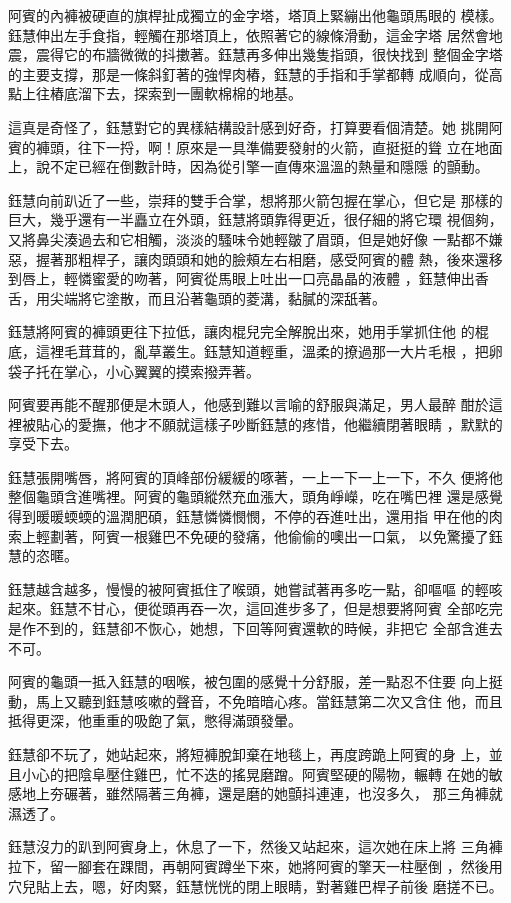 阿賓的內褲被硬直的旗桿扯成獨立的金字塔，塔頂上緊繃出他龜頭馬眼的
模樣。鈺慧伸出左手食指，輕觸在那塔頂上，依照著它的線條滑動，這金字塔
居然會地震，震得它的布牆微微的抖擻著。鈺慧再多伸出幾隻指頭，很快找到
整個金字塔的主要支撐，那是一條斜釘著的強悍肉樁，鈺慧的手指和手掌都轉
成順向，從高點上往樁底溜下去，探索到一團軟棉棉的地基。

這真是奇怪了，鈺慧對它的異樣結構設計感到好奇，打算要看個清楚。她
挑開阿賓的褲頭，往下一捋，啊！原來是一具準備要發射的火箭，直挺挺的聳
立在地面上，說不定已經在倒數計時，因為從引擎一直傳來溫溫的熱量和隱隱
的顫動。

鈺慧向前趴近了一些，崇拜的雙手合掌，想將那火箭包握在掌心，但它是
那樣的巨大，幾乎還有一半矗立在外頭，鈺慧將頭靠得更近，很仔細的將它環
視個夠，又將鼻尖湊過去和它相觸，淡淡的騷味令她輕皺了眉頭，但是她好像
一點都不嫌惡，握著那粗桿子，讓肉頭頭和她的臉頰左右相磨，感受阿賓的體
熱，後來還移到唇上，輕憐蜜愛的吻著，阿賓從馬眼上吐出一口亮晶晶的液體
，鈺慧伸出香舌，用尖端將它塗散，而且沿著龜頭的菱溝，黏膩的深舐著。

鈺慧將阿賓的褲頭更往下拉低，讓肉棍兒完全解脫出來，她用手掌抓住他
的棍底，這裡毛茸茸的，亂草叢生。鈺慧知道輕重，溫柔的撩過那一大片毛根
，把卵袋子托在掌心，小心翼翼的摸索撥弄著。

阿賓要再能不醒那便是木頭人，他感到難以言喻的舒服與滿足，男人最醉
酣於這裡被貼心的愛撫，他才不願就這樣子吵斷鈺慧的疼惜，他繼續閉著眼睛
，默默的享受下去。

鈺慧張開嘴唇，將阿賓的頂峰部份緩緩的啄著，一上一下一上一下，不久
便將他整個龜頭含進嘴裡。阿賓的龜頭縱然充血漲大，頭角崢嶸，吃在嘴巴裡
還是感覺得到暖暖蝡蝡的溫潤肥碩，鈺慧憐憐憫憫，不停的吞進吐出，還用指
甲在他的肉索上輕劃著，阿賓一根雞巴不免硬的發痛，他偷偷的噢出一口氣，
以免驚擾了鈺慧的恣暱。

鈺慧越含越多，慢慢的被阿賓抵住了喉頭，她嘗試著再多吃一點，卻嘔嘔
的輕咳起來。鈺慧不甘心，便從頭再吞一次，這回進步多了，但是想要將阿賓
全部吃完是作不到的，鈺慧卻不恢心，她想，下回等阿賓還軟的時候，非把它
全部含進去不可。

阿賓的龜頭一抵入鈺慧的咽喉，被包圍的感覺十分舒服，差一點忍不住要
向上挺動，馬上又聽到鈺慧咳嗽的聲音，不免暗暗心疼。當鈺慧第二次又含住
他，而且抵得更深，他重重的吸飽了氣，憋得滿頭發暈。

鈺慧卻不玩了，她站起來，將短褲脫卸棄在地毯上，再度跨跪上阿賓的身
上，並且小心的把陰阜壓住雞巴，忙不迭的搖晃磨蹭。阿賓堅硬的陽物，輾轉
在她的敏感地上夯碾著，雖然隔著三角褲，還是磨的她顫抖連連，也沒多久，
那三角褲就濕透了。

鈺慧沒力的趴到阿賓身上，休息了一下，然後又站起來，這次她在床上將
三角褲拉下，留一腳套在踝間，再朝阿賓蹲坐下來，她將阿賓的擎天一柱壓倒
，然後用穴兒貼上去，嗯，好肉緊，鈺慧恍恍的閉上眼睛，對著雞巴桿子前後
磨搓不已。


